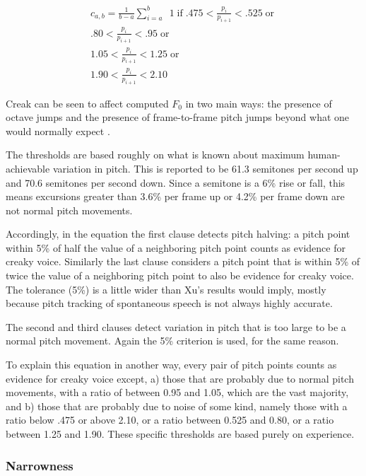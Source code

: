 \documentclass[11pt]{article}
\begin{document}
\begin{multline}
c_{a,b} = \frac{1}{b-a} \sum\limits_{i=a}^b \enspace 1 \operatorname{if}  .475 < \frac{p_i}{p_{i+1}} < .525 \operatorname{or} \\  .80 < \frac{p_i}{ p_{i+1}} < .95  \operatorname{or} \\ 1.05 < \frac{p_i}{ p_{i+1}} < 1.25 \operatorname{or} \\ 1.90 < \frac{p_i}{ p_{i+1}} < 2.10
\end{multline}

Creak can be seen to affect computed $F_0$ in two main ways: the
presence of octave jumps and the presence of frame-to-frame pitch
jumps beyond what one would normally expect \cite{keating15}.

The thresholds are based roughly on what is known about maximum
human-achievable variation in pitch.  This is reported to be 61.3
semitones per second up and 70.6 semitones per second
down\cite{xu02-pitch-change-rate}.  Since a semitone is a 6\% rise or
fall, this means excursions greater than 3.6\% per frame up or
4.2\% per frame down are not normal pitch movements. 

Accordingly, in the equation the first clause detects pitch halving: a
pitch point within 5\% of half the value of a neighboring pitch point
counts as evidence for creaky voice.  Similarly the last clause
considers a pitch point that is within 5\% of twice the value of a
neighboring pitch point to also be evidence for creaky voice.  The
tolerance (5\%) is a little wider than Xu's results would imply,
mostly because pitch tracking of spontaneous speech is not always
highly accurate.

The second and third clauses detect variation in pitch that is too
large to be a normal pitch movement.  Again the 5\% criterion is used,
for the same reason.  

To explain this equation in another way, every pair of pitch points
counts as evidence for creaky voice except, a) those that are probably
due to normal pitch movements, with a ratio of between 0.95 and 1.05,
which are the vast majority, and b) those that are probably due to
noise of some kind, namely those with a ratio below .475 or above
2.10, or a ratio between 0.525 and 0.80, or a ratio between 1.25 and
1.90.  These specific thresholds are based purely on experience.

\subsubsection{Narrowness}
\end{document}
